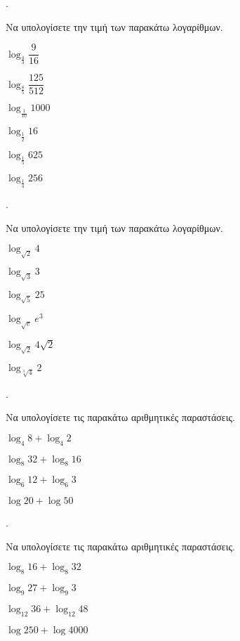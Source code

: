 \documentclass[11pt,a4paper,twocolumn]{article}
\newcounter{askhsh}
\newcommand{\askhsh}{\large\theaskhsh.\ \addtocounter{askhsh}{1}}
\begin{document}
\askhsh Να υπολογίσετε την τιμή των παρακάτω λογαρίθμων.
\begin{multicols}{2}
\begin{alist}
\item $ \log_{\frac{4}{3}}{\dfrac{9}{16}} $
\item $ \log_{\frac{8}{5}}{\dfrac{125}{512}} $
\item $ \log_{\frac{1}{10}}{1000} $
\item $ \log_{\frac{1}{2}}{16} $
\item $ \log_{\frac{1}{5}}{625} $
\item $ \log_{\frac{1}{4}}{256} $
\end{alist}
\end{multicols}
\askhsh Να υπολογίσετε την τιμή των παρακάτω λογαρίθμων.
\begin{multicols}{2}
\begin{alist}
\item $ \log_{\sqrt{2}}{4} $
\item $ \log_{\sqrt{3}}{3} $
\item $ \log_{\sqrt{5}}{25} $
\item $ \log_{\sqrt{e}}{e^3} $
\item $ \log_{\sqrt{2}}{4\sqrt{2}} $
\item $ \log_{\sqrt[3]{4}}{2} $
\end{alist}
\end{multicols}
\askhsh Να υπολογίσετε τις παρακάτω αριθμητικές παραστάσεις.
\begin{multicols}{2}
\begin{alist}
\item $ \log_{4}{8}+\log_{4}{2} $
\item $ \log_{8}{32}+\log_{8}{16} $
\item $ \log_{6}{12}+\log_{6}{3} $
\item $ \log{20}+\log{50} $
\end{alist}
\end{multicols}
\askhsh Να υπολογίσετε τις παρακάτω αριθμητικές παραστάσεις.
\begin{alist}
\item $ \log_{8}{16}+\log_{8}{32} $
\item $ \log_{9}{27}+\log_{9}{3} $
\item $ \log_{12}{36}+\log_{12}{48} $
\item $ \log{250}+\log{4000} $
\end{alist}
\end{document}
